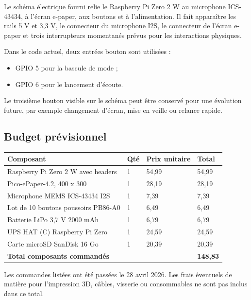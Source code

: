 Le schéma électrique fourni relie le Raspberry Pi Zero 2 W au microphone
ICS-43434, à l'écran e-paper, aux boutons et à l'alimentation. Il fait apparaître
les rails 5 V et 3,3 V, le connecteur du microphone I2S, le connecteur de
l'écran e-paper et trois interrupteurs momentanés prévus pour les interactions
physiques.

Dans le code actuel, deux entrées bouton sont utilisées :

\begin{itemize}
    \item GPIO 5 pour la bascule de mode ;
    \item GPIO 6 pour le lancement d'écoute.
\end{itemize}

Le troisième bouton visible sur le schéma peut être conservé pour une évolution
future, par exemple changement d'écran, mise en veille ou relance rapide.

\subsection{Budget prévisionnel}

\begin{longtable}{|p{5cm}|p{2cm}|p{3cm}|p{3cm}|}
\hline
\textbf{Composant} & \textbf{Qté} & \textbf{Prix unitaire} & \textbf{Total} \\
\hline
Raspberry Pi Zero 2 W avec headers & 1 & 54,99 \texteuro{} & 54,99 \texteuro{} \\
\hline
Pico-ePaper-4.2, 400 x 300 & 1 & 28,19 \texteuro{} & 28,19 \texteuro{} \\
\hline
Microphone MEMS ICS-43434 I2S & 1 & 7,39 \texteuro{} & 7,39 \texteuro{} \\
\hline
Lot de 10 boutons poussoirs PB86-A0 & 1 & 6,49 \texteuro{} & 6,49 \texteuro{} \\
\hline
Batterie LiPo 3,7 V 2000 mAh & 1 & 6,79 \texteuro{} & 6,79 \texteuro{} \\
\hline
UPS HAT (C) Raspberry Pi Zero & 1 & 24,59 \texteuro{} & 24,59 \texteuro{} \\
\hline
Carte microSD SanDisk 16 Go & 1 & 20,39 \texteuro{} & 20,39 \texteuro{} \\
\hline
\textbf{Total composants commandés} & & & \textbf{148,83 \texteuro{}} \\
\hline
\end{longtable}

Les commandes listées ont été passées le 28 avril 2026. Les frais éventuels de
matière pour l'impression 3D, câbles, visserie ou consommables ne sont pas
inclus dans ce total.
